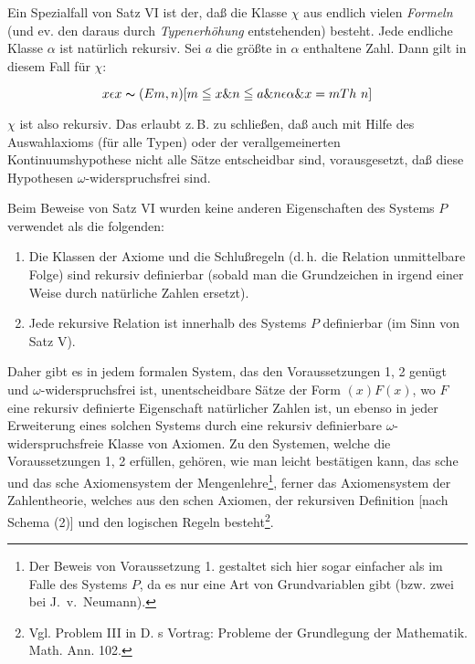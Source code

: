 \documentclass[draft]{scrartcl}
\let\oldleft\left
\let\oldright\right
\def\left#1{%
	    \global\advance\bracketnum1\relax 
		\colorlet{temp}{.}%
		    \csname bracketcolor\the\bracketnum\endcsname
			\oldleft#1%
			    \color{temp}%
	}
\def\right#1{%
	    \colorlet{temp}{.}%
		\csname bracketcolor\the\bracketnum\endcsname
		    \oldright#1%
			\global\advance\bracketnum-1\relax
			    \color{temp}%
	}
\def\left#1{#1}
\def\right#1{#1}
\begin{document}
Ein Spezialfall von Satz VI ist der, daß die Klasse $\chi$ aus endlich
vielen \textit{Formeln} (und ev. den daraus durch \textit{Typenerhöhung} 
entstehenden) besteht. Jede endliche Klasse $\alpha$ ist natürlich rekursiv.
Sei $a$ die größte in $\alpha$ enthaltene Zahl. Dann gilt in diesem
Fall für $\chi$:

$$
x \epsilon x \thicksim \left(Em, n\right) \left[m \leqq x \& n \leqq a \& n \epsilon \alpha \& x = m Th\ n\right]
$$

$\chi$ ist also rekursiv. Das erlaubt z.\,B. zu schließen, daß auch mit Hilfe des Auswahlaxioms (für alle Typen) oder der verallgemeinerten Kontinuumshypothese nicht alle Sätze entscheidbar sind, vorausgesetzt, daß diese Hypothesen $\omega$-widerspruchsfrei sind.

Beim Beweise von Satz VI wurden keine anderen Eigenschaften des Systems $P$ verwendet als die folgenden:

\begin{enumerate}
	\item Die Klassen der Axiome und die Schlußregeln
	 (d.\,h. die Relation \glqq unmittelbare Folge\grqq) sind rekursiv definierbar (sobald man die Grundzeichen in irgend einer Weise durch natürliche Zahlen ersetzt).
	 \item Jede rekursive Relation ist innerhalb des Systems $P$ definierbar (im Sinn von Satz V).
\end{enumerate}

Daher gibt es in jedem formalen System, das den Voraussetzungen 1, 2 genügt und $\omega$-widerspruchsfrei ist, unentscheidbare Sätze der Form $\left(x\right)F\left(x\right)$, wo $F$ eine rekursiv definierte Eigenschaft natürlicher Zahlen ist, un ebenso in jeder Erweiterung eines solchen Systems durch eine rekursiv definierbare $\omega$-widerspruchsfreie Klasse von Axiomen.
Zu den Systemen, welche die Voraussetzungen 1, 2 erfüllen, gehören, wie man leicht bestätigen kann, das sche und das sche Axiomensystem
der Mengenlehre\footnote{Der Beweis von Voraussetzung 1. gestaltet sich hier sogar einfacher als im Falle des Systems $P$, da es nur eine Art von Grundvariablen gibt (bzw. zwei bei J.~v.~Neumann).},
ferner das Axiomensystem der Zahlentheorie, welches aus
den schen Axiomen, der rekursiven Definition [nach Schema (2)] und den logischen Regeln besteht\footnote{Vgl. Problem III in D. s Vortrag: Probleme der Grundlegung der Mathematik. Math. Ann. 102.}.
\end{document}
